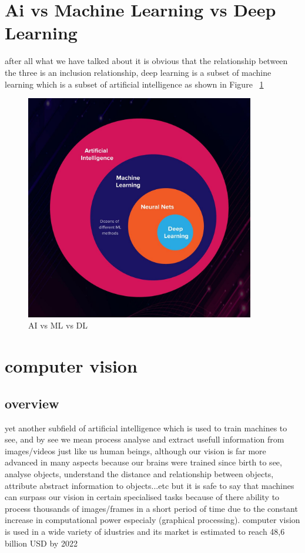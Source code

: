 \section{Ai vs Machine Learning vs Deep Learning}
    after all what we have talked about it is obvious that the relationship between the three is an inclusion relationship, deep learning is a subset of machine learning which is a subset of artificial intelligence as shown in Figure ~\ref{fig:versus} 

\begin{figure}[htbp]
\begin{center}
\includegraphics[width=10cm]{./chapter-02-general-ai-information/versus.jpg}
\end{center}
\caption{AI vs ML vs DL ~\cite{versus}}
\label{fig:versus}
\end{figure}





\section{computer vision}
    \subsection{overview}
        yet another subfield of artificial intelligence which is used to train machines to see, and by see we mean process analyse and extract usefull information from images/videos just like us human beings, although our vision is far more advanced in many aspects because our brains were trained since birth to see, analyse objects, understand the distance and relationship between objects, attribute abstract information to objects...etc but it is safe to say that machines can surpass our vision in certain specialised tasks because of there ability to process thousands of images/frames in a short period of time due to the constant increase in computational power especialy (graphical processing). computer vision is used in a wide variety of idustries and its market is estimated to reach 48,6 billion USD by 2022 ~\cite{machine-learning-ibm}



